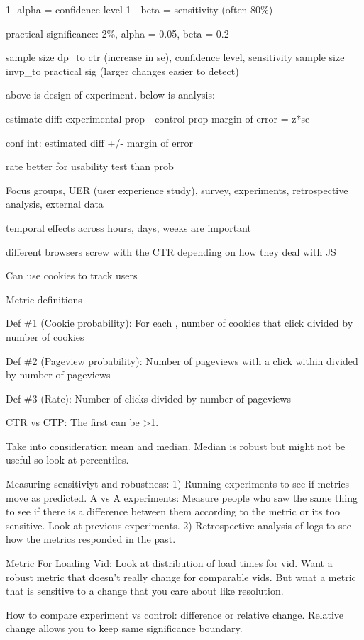 \documentclass[]{book}
\begin{document}
1- alpha = confidence level
1 - beta = sensitivity (often 80\%)

practical significance: 2\%, alpha = 0.05, beta = 0.2

sample size dp\_to ctr (increase in se), confidence level, sensitivity
sample size invp\_to practical sig (larger changes easier to detect)

above is design of experiment. below is analysis:

estimate diff: experimental prop - control prop
margin of error = z*se

conf int: estimated diff +/- margin of error

rate better for usability test than prob

Focus groups, UER (user experience study), survey, experiments, retrospective analysis, external data

temporal effects across hours, days, weeks are important

different browsers screw with the CTR depending on how they deal with JS

Can use cookies to track users

Metric definitions

Def \#1 (Cookie probability): For each , number of cookies that click divided by number of cookies

Def \#2 (Pageview probability): Number of pageviews with a click within divided by number of pageviews

Def \#3 (Rate): Number of clicks divided by number of pageviews

CTR vs CTP: The first can be \textgreater{}1.

Take into consideration mean and median. Median is robust but might not be useful so look at percentiles.

Measuring sensitiviyt and robustness: 1) Running experiments to see if metrics move as predicted. A vs A experiments: Measure people who saw the same thing to see if there is a difference between them according to the metric or its too sensitive. Look at previous experiments. 2) Retrospective analysis of logs to see how the metrics responded in the past.

Metric For Loading Vid: Look at distribution of load times for vid. Want a robust metric that doesn't really change for comparable vids. But wnat a metric that is sensitive to a change that you care about like resolution.

How to compare experiment vs control: difference or relative change. Relative change allows you to keep same significance boundary.
\end{document}
